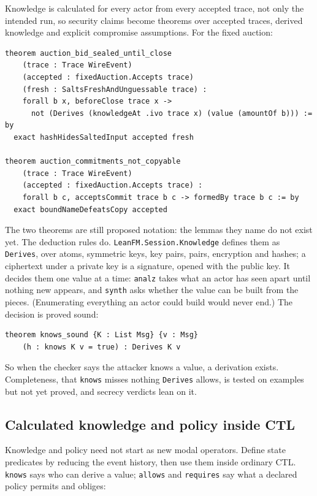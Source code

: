 Knowledge is calculated for every actor from every accepted trace, not only the
intended run, so security claims become theorems over accepted traces, derived
knowledge and explicit compromise assumptions. For the fixed auction:

\begin{lstlisting}
theorem auction_bid_sealed_until_close
    (trace : Trace WireEvent)
    (accepted : fixedAuction.Accepts trace)
    (fresh : SaltsFreshAndUnguessable trace) :
    forall b x, beforeClose trace x ->
      not (Derives (knowledgeAt .ivo trace x) (value (amountOf b))) := by
  exact hashHidesSaltedInput accepted fresh

theorem auction_commitments_not_copyable
    (trace : Trace WireEvent)
    (accepted : fixedAuction.Accepts trace) :
    forall b c, acceptsCommit trace b c -> formedBy trace b c := by
  exact boundNameDefeatsCopy accepted
\end{lstlisting}

The two theorems are still proposed notation: the lemmas they name do not
exist yet. The deduction rules do. \texttt{LeanFM.Session.Knowledge} defines
them as \texttt{Derives}, over atoms, symmetric keys, key pairs, pairs,
encryption and hashes; a ciphertext under a private key is a signature, opened
with the public key. It decides them one value at a time: \texttt{analz} takes
what an actor has seen apart until nothing new appears, and \texttt{synth} asks
whether the value can be built from the pieces. (Enumerating everything an actor
could build would never end.) The decision is proved sound:

\begin{lstlisting}
theorem knows_sound {K : List Msg} {v : Msg}
    (h : knows K v = true) : Derives K v
\end{lstlisting}

So when the checker says the attacker knows a value, a derivation exists.
Completeness, that \texttt{knows} misses nothing \texttt{Derives} allows, is
tested on examples but not yet proved, and secrecy verdicts lean on it.

\subsection{Calculated knowledge and policy inside CTL}

Knowledge and policy need not start as new modal operators. Define state
predicates by reducing the event history, then use them inside ordinary CTL.
\texttt{knows} says who can derive a value; \texttt{allows} and
\texttt{requires} say what a declared policy permits and obliges:

